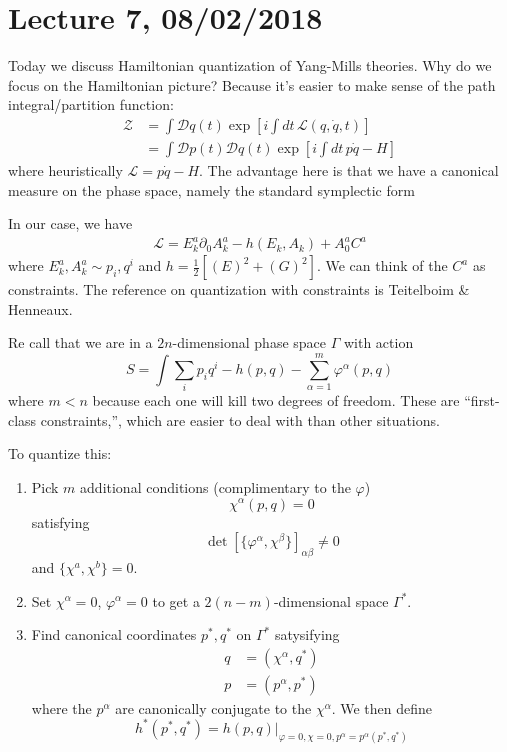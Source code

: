 \section*{Lecture 7, 08/02/2018}
Today we discuss Hamiltonian quantization of Yang-Mills theories.
Why do we focus on the Hamiltonian picture?
Because it's easier to make sense of the path integral/partition function:
\begin{align*}
\mathcal Z &= \int \mathcal D q(t) \exp \left[i \int dt\, \mathcal{L}(q, \dot q, t)\right]\\
&= \int \mathcal D p(t) \mathcal D q(t) \exp \left[ i\int dt\, p\dot q- H \right]
\end{align*}
where heuristically $\mathcal L = p \dot q - H.$
The advantage here is that we have a canonical measure on the phase space, namely the standard symplectic form 

In our case, we have
\begin{align*}
\mathcal L = E_k^a \partial_0 A_k^a - h(E_k , A_k) + A_0^a C^a
\end{align*}
where $E_k^a, A_k^a \sim p_i, q^i$ and $h = \frac{1}{2} [(E)^2 + (G)^2]$.
We can think of the $C^a$ as constraints.
The reference on quantization with constraints is Teitelboim \& Henneaux.

Re call that we are in a $2n$-dimensional phase space $\Gamma$ with action
\[
S = \int \sum_i p_i q^i - h(p,q) - \sum_{\alpha = 1}^m \varphi^\alpha(p,q)
\]
where $m < n$ because each one will kill two degrees of freedom.
These are ``first-class constraints,'', which are easier to deal with than other situations.

To quantize this: 
\begin{enumerate}
    \item Pick $m$ additional conditions (complimentary to the $\varphi$)
    \[
    \chi^\alpha(p,q) = 0
    \]
    satisfying
    \[
    \det [ \{ \varphi^\alpha, \chi^\beta\}]_{\alpha \beta} \ne 0
    \]
    and $\{\chi^a, \chi^b\} = 0.$
    \item Set $\chi^\alpha = 0$, $\varphi^\alpha = 0$ to get a $2(n-m)$-dimensional space $\Gamma^*$.
    \item Find canonical coordinates $p^*, q^*$ on $\Gamma^*$ satysifying
    \begin{align*}
    q &= (\chi^\alpha, q^*)\\
    p &= (p^\alpha, p^*)
    \end{align*}
    where the $p^\alpha$ are canonically conjugate to the $\chi^\alpha$.
    We then define
    \[
    h^*(p^*,q^*) = h(p,q)|_{\varphi = 0, \chi = 0, p^\alpha = p^\alpha(p^*,q^*)}
    \]
\end{enumerate}

